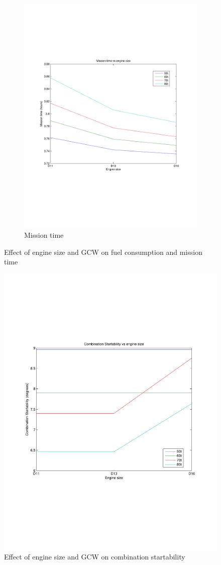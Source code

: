 \documentclass{article}
\begin{document}
\begin{figure}[h!]
\begin{subfigure}{.5\textwidth}
	\includegraphics[width=\linewidth, clip=true, trim=45 185 65 210]{Figures/Engine_size_and_GCW/Mission_time_vs_GCW_and_engine_size.pdf}
	\caption{Mission time}
\end{subfigure}
\caption{Effect of engine size and GCW on fuel consumption and mission time}
\label{timeFuelGCWEngine}
\end{figure}

\begin{figure}[h!]
\centering
\includegraphics[width=0.5\linewidth, clip=true, trim=45 185 65 208]{Figures/Engine_size_and_GCW/Combination_startability_vs_GCW_and_engine_size.pdf}
\caption{Effect of engine size and GCW on combination startability}
\label{startabilityEngineGCW}
\end{figure}
\end{document}
